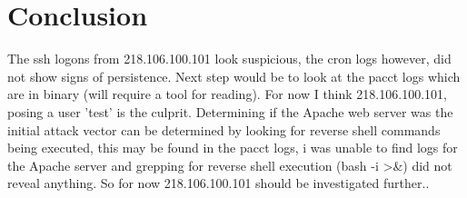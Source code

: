\documentclass[
	letterpaper, %
	10pt, %
	unnumberedsections, %
	twoside, %
]{APAAssignment}
\begin{document}
\section{Conclusion}
The ssh logons from 218.106.100.101 look suspicious, the cron logs however, did not show signs of persistence. Next step would be to look at the pacct logs which are in binary (will require a tool for reading). For now I think 218.106.100.101, posing a user 'test' is the culprit. Determining if the Apache web server was the initial attack vector can be determined by looking for reverse shell commands being executed, this may be found in the pacct logs, i was unable to find logs for the Apache server and grepping for reverse shell execution (bash -i >&) did not reveal anything. So for now 218.106.100.101 should be investigated further..



\printbibliography %




%


\clearpage
\end{document}
